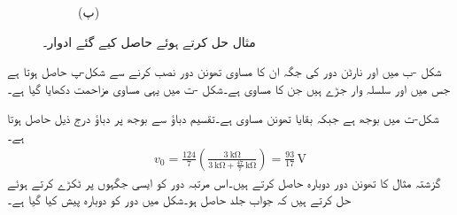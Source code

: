 \begin{figure}
\begin{subfigure}{0.5\textwidth}
\caption*{(پ)}
\end{subfigure}%
\begin{subfigure}{0.5\textwidth}
\centering
{}
\end{subfigure}%
\caption*{(ت)}
\caption{مثال  حل کرتے ہوئے حاصل کیے گئے ادوار۔}
\label{شکل_مثال_تھونن_سے_نارٹن_پ}
\end{figure}

شکل -ب میں  اور  نارٹن دور  کی جگہ ان کا مساوی تھونن دور  نصب کرنے سے شکل-پ حاصل ہوتا ہے جس میں  اور  سلسلہ وار جڑے ہیں جن کا مساوی  ہے۔شکل -ت میں یہی مساوی مزاحمت دکھایا گیا ہے۔

شکل-ت میں  بوجھ ہے جبکہ بقایا تھونن مساوی ہے۔تقسیم دباؤ سے بوجھ پر دباؤ درج ذیل حاصل ہوتا ہے۔
\begin{align*}
v_0=\frac{124}{7}\left(\frac{\SI{3}{\kilo\ohm}}{\SI{3}{\kilo\ohm}+\frac{47}{7}\,\si{\kilo\ohm}} \right)=\frac{93}{17} \, \si{\volt}
\end{align*}
گزشتہ مثال کا تھونن دور دوبارہ حاصل کرتے ہیں۔اس مرتبہ دور کو ایسی جگہوں پر ٹکڑے کرتے ہوئے حل کرتے ہیں کہ جواب جلد حاصل ہو۔شکل  میں دور کو دوبارہ پیش کیا گیا ہے۔


